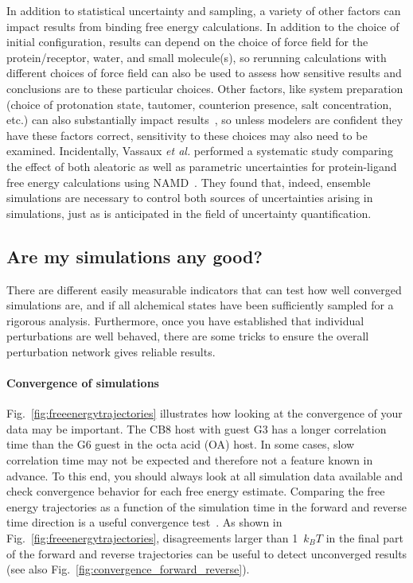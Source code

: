In addition to statistical uncertainty and sampling, a variety of other factors can impact results from binding free energy calculations. In addition to the choice of initial configuration, results can depend on the choice of force field for the protein/receptor, water, and small molecule(s), so rerunning calculations with different choices of force field can also be used to assess how sensitive results and conclusions are to these particular choices. Other factors, like system preparation (choice of protonation state, tautomer, counterion presence, salt concentration, etc.) can also substantially impact results~\cite{mobley2017predicting, mobley2017predictinga}, so unless modelers are confident they have these factors correct, sensitivity to these choices may also need to be examined.
Incidentally, Vassaux \textit{et al.} performed a systematic study comparing the effect of both aleatoric as well as parametric uncertainties for protein-ligand free energy calculations using NAMD~\cite{vassaux2021}. They found that, indeed, ensemble simulations are necessary to control both sources of uncertainties arising in simulations, just as is anticipated in the field of uncertainty quantification.

\subsection{Are my simulations any good?}
\label{sec:are-they-good}
There are different easily measurable indicators that can test how well converged simulations are, and if all alchemical states have been sufficiently sampled for a rigorous analysis. Furthermore, once you have established that individual perturbations are well behaved, there are some tricks to ensure the overall perturbation network gives reliable results.

\paragraph{Convergence of simulations}
Fig.~\ref{fig:freeenergytrajectories} illustrates how looking at the convergence of your data may be important. The CB8 host with guest G3 has a longer correlation time than the G6 guest in the octa acid (OA) host. In some cases, slow correlation time may not be expected and therefore not a feature known in advance. To this end, you should always look at all simulation data available and check convergence behavior for each free energy estimate.
Comparing the free energy trajectories as a function of the simulation time in the forward and reverse time direction is a useful convergence test~\cite{klimovich2015guidelines}.
As shown in Fig.~\ref{fig:freeenergytrajectories}, disagreements larger than 1~$k_{B}T$ in the final part of the forward and reverse trajectories can be useful to detect unconverged results (see also Fig.~\ref{fig:convergence_forward_reverse}).


